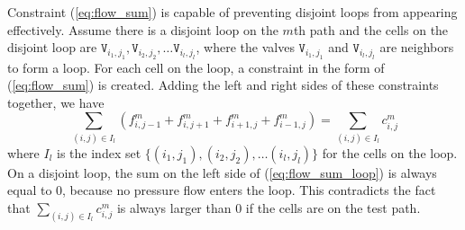 
Constraint (\ref{eq:flow_sum}) is capable of preventing disjoint loops from appearing
effectively.
Assume there is a disjoint loop on the $m$th path and the cells
on the disjoint loop are $\mathtt{V}_{i_1,j_1}, \mathtt{V}_{i_2,j_2},\dots 
\mathtt{V}_{i_l,j_l}$, where the valves 
$\mathtt{V}_{i_1,j_1}$ and $\mathtt{V}_{i_l,j_l}$ are neighbors to form a loop.
For each cell on the loop, a constraint in the form of
(\ref{eq:flow_sum}) is created. Adding the left and right sides of these constraints
together, we have
\begin{equation} 
\label{eq:flow_sum_loop} 
\sum_{(i,j)\in I_l} (f^m_{i,j-1}+ f^m_{i,j+1}+ f^m_{i+1,j}+ f^m_{i-1,j}) = 
\sum_{(i,j)\in I_l} c^m_{i,j}
\end{equation} 
where $I_l$ is the index set  $\{(i_1,j_1), (i_2,j_2), \dots (i_l,j_l)\}$ 
for the cells on the loop.
%
On a disjoint loop, the sum on the left
side of (\ref{eq:flow_sum_loop}) is always equal to 0, because no pressure
flow enters the loop. This contradicts 
the fact that $\sum_{(i,j)\in I_l} c^m_{i,j}$ is always larger than 0 if the
cells are on the test path.
